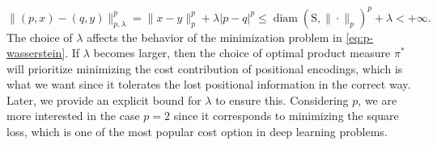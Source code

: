 \documentclass[11pt]{article}
\begin{document}
\begin{equation*}
    \|(p,x) - (q,y)\|_{p,\lambda}^p = \|x-y\|_p^p + \lambda|p-q|^p \leq \operatorname{diam}(\mathrm{S}, \|\cdot\|_p)^p + \lambda < +\infty.
\end{equation*}
The choice of $\lambda$ affects the behavior of the minimization problem in \eqref{eq:p-wasserstein}. If $\lambda$ becomes larger, then the choice of optimal product measure $\pi^*$ will prioritize minimizing the cost contribution of positional encodings, which is what we want since it tolerates the lost positional information in the correct way. Later, we provide an explicit bound for $\lambda$ to ensure this. Considering $p$, we are more interested in the case $p=2$ since it corresponds to minimizing the square loss, which is one of the most popular cost option in deep learning problems.
\end{document}
